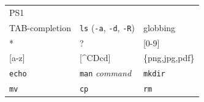 \documentclass[]{krantz}
\begin{document}
\begin{longtable}[]{@{}lll@{}}
\begin{minipage}[t]{0.22\columnwidth}
PS1\strut
\end{minipage}\tabularnewline
\begin{minipage}[t]{0.34\columnwidth}\raggedright
TAB-completion\strut
\end{minipage} & \begin{minipage}[t]{0.35\columnwidth}\raggedright
\texttt{ls} (\texttt{-a}, \texttt{-d}, \texttt{-R})\strut
\end{minipage} & \begin{minipage}[t]{0.22\columnwidth}\raggedright
globbing\strut
\end{minipage}\tabularnewline
\begin{minipage}[t]{0.34\columnwidth}\raggedright
*\strut
\end{minipage} & \begin{minipage}[t]{0.35\columnwidth}\raggedright
?\strut
\end{minipage} & \begin{minipage}[t]{0.22\columnwidth}\raggedright
{[}0-9{]}\strut
\end{minipage}\tabularnewline
\begin{minipage}[t]{0.34\columnwidth}\raggedright
{[}a-z{]}\strut
\end{minipage} & \begin{minipage}[t]{0.35\columnwidth}\raggedright
{[}\^{}CDcd{]}\strut
\end{minipage} & \begin{minipage}[t]{0.22\columnwidth}\raggedright
\{png,jpg,pdf\}\strut
\end{minipage}\tabularnewline
\begin{minipage}[t]{0.34\columnwidth}\raggedright
\texttt{echo}\strut
\end{minipage} & \begin{minipage}[t]{0.35\columnwidth}\raggedright
\texttt{man} \emph{command}\strut
\end{minipage} & \begin{minipage}[t]{0.22\columnwidth}\raggedright
\texttt{mkdir}\strut
\end{minipage}\tabularnewline
\begin{minipage}[t]{0.34\columnwidth}\raggedright
\texttt{mv}\strut
\end{minipage} & \begin{minipage}[t]{0.35\columnwidth}\raggedright
\texttt{cp}\strut
\end{minipage} & \begin{minipage}[t]{0.22\columnwidth}\raggedright
\texttt{rm}\strut
\end{minipage}\tabularnewline

\end{longtable}
\end{document}
